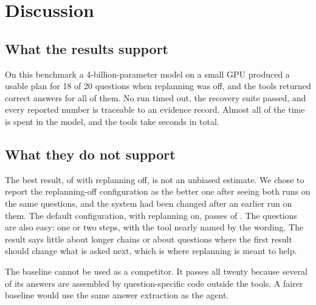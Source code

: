\section{Discussion}

\subsection{What the results support}
On this benchmark a 4-billion-parameter model on a small GPU produced a usable plan for 18 of 20 questions when replanning was off, and the tools returned correct answers for all of them. No run timed out, the recovery suite passed, and every reported number is traceable to an evidence record. Almost all of the time is spent in the model, and the tools take seconds in total.

\subsection{What they do not support}
The best result, \NoRepQ{} of \NoRepN{} with replanning off, is not an unbiased estimate. We chose to report the replanning-off configuration as the better one after seeing both runs on the same questions, and the system had been changed after an earlier run on them. The default configuration, with replanning on, passes \MainQ{} of \MainN{}. The questions are also easy: one or two steps, with the tool nearly named by the wording. The result says little about longer chains or about questions where the first result should change what is asked next, which is where replanning is meant to help.

The baseline cannot be used as a competitor. It passes all twenty because several of its answers are assembled by question-specific code outside the tools. A fairer baseline would use the same answer extraction as the agent.

